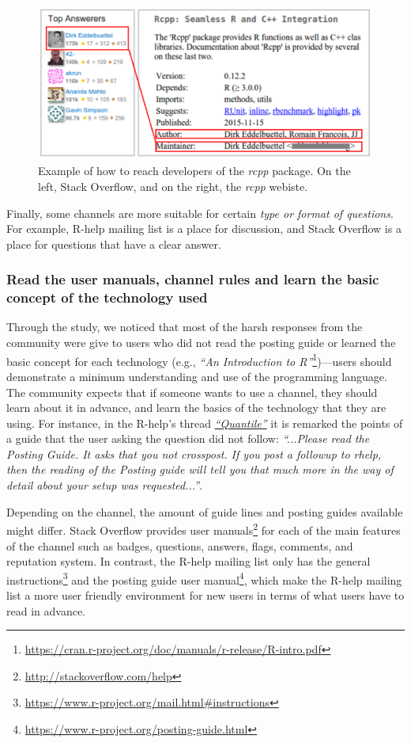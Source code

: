 \documentclass{sig-alternate-05-2015}
\begin{document}
		\begin{figure} [!htb]
			\centering
			\includegraphics[width=\columnwidth]{Figures/CCchannel}
			\caption{Example of how to reach developers of the \emph{rcpp} package. On the left, Stack Overflow, and on the right, the \emph{rcpp} webiste.}
			\label{fig:CCchannel}
		\end{figure}

		Finally, some channels are more suitable for certain \emph{type or format of questions}. 
		For example, R-help mailing list is a place for discussion, and Stack Overflow is a place for questions that have a clear answer.


	\subsubsection{Read the user manuals, channel rules and learn the basic concept of the technology used}

		Through the study, we noticed that most of the harsh responses from the community were give to users who did not read the posting guide or learned the basic concept for each technology (e.g., \textit{``An Introduction to R''}\footnote{\url{https://cran.r-project.org/doc/manuals/r-release/R-intro.pdf}})---users should demonstrate a minimum understanding and use of the programming language.
		The community expects that if someone wants to use a channel, they should learn about it in advance, and learn the basics of the technology that they are using.
		For instance, in the R-help's thread \textit{\href{http://goo.gl/Dc8gXw}{``Quantile''}} it is remarked the points of a guide that the user asking the question did not follow: \textit{``...Please read the Posting Guide. It asks that you not crosspost. If you post a followup to rhelp, then the reading of the Posting guide will tell you that much more in the way of detail about your setup was requested...''}.

		Depending on the channel, the amount of guide lines and posting guides available might differ. 
		Stack Overflow provides user manuals\footnote{\url{http://stackoverflow.com/help}} for each of the main features of the channel such as badges, questions, answers, flags, comments, and reputation system.
		In contrast, the R-help mailing list only has the general instructions\footnote{\url{https://www.r-project.org/mail.html\#instructions}} and the posting guide user manual\footnote{\url{https://www.r-project.org/posting-guide.html}}, which make the R-help mailing list a more user friendly environment for new users in terms of what users have to read in advance.
\end{document}
